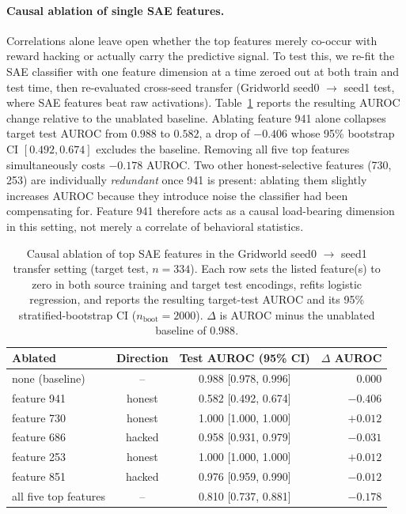 \documentclass[11pt]{article}
\newcommand{\auroc}{AUROC}
\begin{document}
\paragraph{Causal ablation of single SAE features.}
Correlations alone leave open whether the top features merely co-occur with reward hacking or actually carry the predictive signal. To test this, we re-fit the SAE classifier with one feature dimension at a time zeroed out at both train and test time, then re-evaluated cross-seed transfer (Gridworld seed0 $\rightarrow$ seed1 test, where SAE features beat raw activations). Table~\ref{tab:ablation} reports the resulting AUROC change relative to the unablated baseline. Ablating feature 941 alone collapses target test \auroc{} from $0.988$ to $0.582$, a drop of $-0.406$ whose 95\% bootstrap CI $[0.492, 0.674]$ excludes the baseline. Removing all five top features simultaneously costs $-0.178$ AUROC. Two other honest-selective features (730, 253) are individually \emph{redundant} once 941 is present: ablating them slightly increases AUROC because they introduce noise the classifier had been compensating for. Feature 941 therefore acts as a causal load-bearing dimension in this setting, not merely a correlate of behavioral statistics.

\begin{table}[H]
\centering
\caption{Causal ablation of top SAE features in the Gridworld seed0 $\rightarrow$ seed1 transfer setting (target test, $n=334$). Each row sets the listed feature(s) to zero in both source training and target test encodings, refits logistic regression, and reports the resulting target-test AUROC and its 95\% stratified-bootstrap CI ($n_{\text{boot}}=2000$). $\Delta$ is AUROC minus the unablated baseline of $0.988$.}
\label{tab:ablation}
\begin{tabular}{lccr}
\toprule
Ablated & Direction & Test \auroc{} (95\% CI) & $\Delta$ \auroc{}\\
\midrule
none (baseline)        & --      & 0.988 [0.978, 0.996] & $\;\;\,0.000$\\
\midrule
feature 941            & honest  & 0.582 [0.492, 0.674] & $-0.406$\\
feature 730            & honest  & 1.000 [1.000, 1.000] & $+0.012$\\
feature 686            & hacked  & 0.958 [0.931, 0.979] & $-0.031$\\
feature 253            & honest  & 1.000 [1.000, 1.000] & $+0.012$\\
feature 851            & hacked  & 0.976 [0.959, 0.990] & $-0.012$\\
\midrule
all five top features  & --      & 0.810 [0.737, 0.881] & $-0.178$\\
\bottomrule
\end{tabular}
\end{table}
\end{document}
